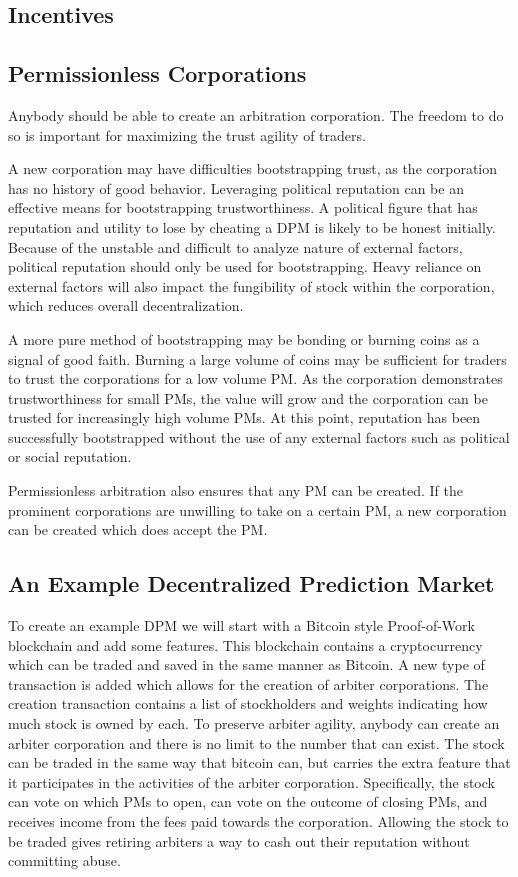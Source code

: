 \documentclass[onecolumn]{article}
\begin{document}
\subsection{Incentives}

\subsection{Permissionless Corporations}
Anybody should be able to create an arbitration corporation.
The freedom to do so is important for maximizing the trust agility of traders.

A new corporation may have difficulties bootstrapping trust, as the corporation has no history of good behavior.
Leveraging political reputation can be an effective means for bootstrapping trustworthiness.
A political figure that has reputation and utility to lose by cheating a DPM is likely to be honest initially.
Because of the unstable and difficult to analyze nature of external factors, political reputation should only be used for bootstrapping.
Heavy reliance on external factors will also impact the fungibility of stock within the corporation, which reduces overall decentralization.

A more pure method of bootstrapping may be bonding or burning coins as a signal of good faith.
Burning a large volume of coins may be sufficient for traders to trust the corporations for a low volume PM.
As the corporation demonstrates trustworthiness for small PMs, the value will grow and the corporation can be trusted for increasingly high volume PMs.
At this point, reputation has been successfully bootstrapped without the use of any external factors such as political or social reputation.

Permissionless arbitration also ensures that any PM can be created.
If the prominent corporations are unwilling to take on a certain PM, a new corporation can be created which does accept the PM.

\subsection{An Example Decentralized Prediction Market}
To create an example DPM we will start with a Bitcoin style Proof-of-Work blockchain and add some features.
This blockchain contains a cryptocurrency which can be traded and saved in the same manner as Bitcoin.
A new type of transaction is added which allows for the creation of arbiter corporations.
The creation transaction contains a list of stockholders and weights indicating how much stock is owned by each.
To preserve arbiter agility, anybody can create an arbiter corporation and there is no limit to the number that can exist.
The stock can be traded in the same way that bitcoin can, but carries the extra feature that it participates in the activities of the arbiter corporation.
Specifically, the stock can vote on which PMs to open, can vote on the outcome of closing PMs, and receives income from the fees paid towards the corporation.
Allowing the stock to be traded gives retiring arbiters a way to cash out their reputation without committing abuse.
\end{document}
